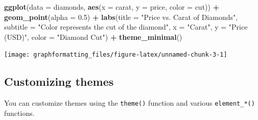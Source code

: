 \documentclass[
]{book}
\newenvironment{Shaded}{\begin{snugshade}}{\end{snugshade}}
\newcommand{\AttributeTok}[1]{\textcolor[rgb]{0.13,0.29,0.53}{#1}}
\newcommand{\FloatTok}[1]{\textcolor[rgb]{0.00,0.00,0.81}{#1}}
\newcommand{\FunctionTok}[1]{\textcolor[rgb]{0.13,0.29,0.53}{\textbf{#1}}}
\newcommand{\NormalTok}[1]{#1}
\newcommand{\SpecialCharTok}[1]{\textcolor[rgb]{0.81,0.36,0.00}{\textbf{#1}}}
\newcommand{\StringTok}[1]{\textcolor[rgb]{0.31,0.60,0.02}{#1}}
\begin{document}
\begin{Shaded}
\begin{Highlighting}[]
\FunctionTok{ggplot}\NormalTok{(}\AttributeTok{data =}\NormalTok{ diamonds, }\FunctionTok{aes}\NormalTok{(}\AttributeTok{x =}\NormalTok{ carat, }\AttributeTok{y =}\NormalTok{ price, }\AttributeTok{color =}\NormalTok{ cut)) }\SpecialCharTok{+}
  \FunctionTok{geom\_point}\NormalTok{(}\AttributeTok{alpha =} \FloatTok{0.5}\NormalTok{) }\SpecialCharTok{+}
  \FunctionTok{labs}\NormalTok{(}\AttributeTok{title =} \StringTok{"Price vs. Carat of Diamonds"}\NormalTok{,}
       \AttributeTok{subtitle =} \StringTok{"Color represents the cut of the diamond"}\NormalTok{,}
       \AttributeTok{x =} \StringTok{"Carat"}\NormalTok{,}
       \AttributeTok{y =} \StringTok{"Price (USD)"}\NormalTok{,}
       \AttributeTok{color =} \StringTok{"Diamond Cut"}\NormalTok{) }\SpecialCharTok{+}
  \FunctionTok{theme\_minimal}\NormalTok{()}
\end{Highlighting}
\end{Shaded}

\texttt{[image: graphformatting\_files/figure-latex/unnamed-chunk-3-1]}

\hypertarget{customizing-themes}{%
\subsection{Customizing themes}\label{customizing-themes}}

You can customize themes using the \texttt{theme()} function and various \texttt{element\_*()} functions.
\end{document}
